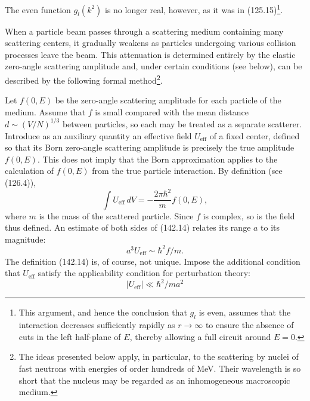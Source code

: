 The even function $g_l(k^2)$ is no longer real, however, as it was in
(125.15)\footnote{This argument, and hence the conclusion that $g_l$ is even,
assumes that the interaction decreases sufficiently rapidly as $r\to\infty$
to ensure the absence of cuts in the left half-plane of $E$, thereby allowing
a full circuit around $E=0$.}.

When a particle beam passes through a scattering medium containing many
scattering centers, it gradually weakens as particles undergoing various
collision processes leave the beam. This attenuation is determined entirely
by the elastic zero-angle scattering amplitude and, under certain conditions
(see below), can be described by the following formal method\footnote{The
ideas presented below apply, in particular, to the scattering by nuclei of
fast neutrons with energies of order hundreds of MeV. Their wavelength is so
short that the nucleus may be regarded as an inhomogeneous macroscopic medium.}.

Let $f(0,E)$ be the zero-angle scattering amplitude for each particle of the
medium. Assume that $f$ is small compared with the mean distance
$d\sim(V/N)^{1/3}$ between particles, so each may be treated as a separate
scatterer. Introduce as an auxiliary quantity an effective field
$U_{\mathrm{eff}}$ of a fixed center, defined so that its Born zero-angle
scattering amplitude is precisely the true amplitude $f(0,E)$. This does not
imply that the Born approximation applies to the calculation of $f(0,E)$ from
the true particle interaction. By definition (see (126.4)),
\begin{equation}
 \int U_{\mathrm{eff}}\,dV=-\frac{2\pi\hbar^2}{m}f(0,E),
 \tag{142.14}
\end{equation}
where $m$ is the mass of the scattered particle. Since $f$ is complex, so is
the field thus defined. An estimate of both sides of (142.14) relates its
range $a$ to its magnitude:
\begin{equation}
 a^3U_{\mathrm{eff}}\sim\hbar^2f/m.
 \tag{142.15}
\end{equation}
The definition (142.14) is, of course, not unique. Impose the additional
condition that $U_{\mathrm{eff}}$ satisfy the applicability condition for
perturbation theory:
\begin{equation}
 |U_{\mathrm{eff}}|\ll\hbar^2/ma^2
 \tag{142.16}
\end{equation}

